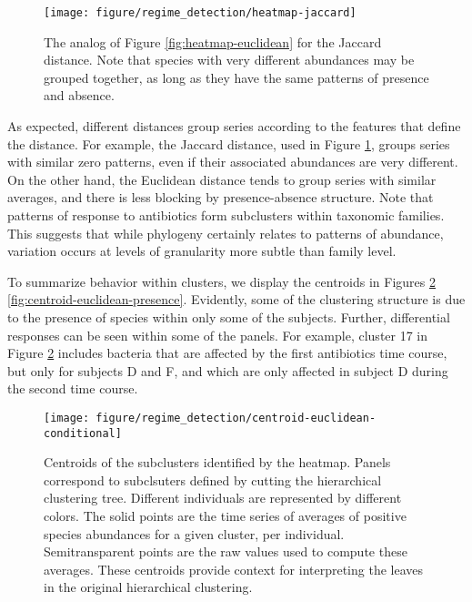 \begin{figure}
  \centering
  \texttt{[image: figure/regime\_detection/heatmap-jaccard]}
  \caption{The analog of Figure \ref{fig:heatmap-euclidean} for the Jaccard
    distance. Note that species with very different abundances may be grouped
    together, as long as they have the same patterns of presence and absence.
    \label{fig:heatmap-jaccard} }
\end{figure}

As expected, different distances group series according to the features that
define the distance. For example, the Jaccard distance, used in Figure
\ref{fig:heatmap-jaccard}, groups series with similar zero patterns, even if
their associated abundances are very different. On the other hand, the Euclidean
distance tends to group series with similar averages, and there is less blocking
by presence-absence structure. Note that patterns of response to antibiotics
form subclusters within taxonomic families. This suggests that while phylogeny
certainly relates to patterns of abundance, variation occurs at levels of
granularity more subtle than family level.

To summarize behavior within clusters, we display the centroids in Figures
\ref{fig:centroid-euclidean-conditional} \ref{fig:centroid-euclidean-presence}.
Evidently, some of the clustering structure is due to the presence of species
within only some of the subjects. Further, differential responses can be seen
within some of the panels. For example, cluster 17 in Figure
\ref{fig:centroid-euclidean-conditional} includes bacteria that are affected by
the first antibiotics time course, but only for subjects D and F, and which are
only affected in subject D during the second time course.

\begin{figure}
  \centering
  \texttt{[image: figure/regime\_detection/centroid-euclidean-conditional]}
  \caption{Centroids of the subclusters identified by the heatmap. Panels
    correspond to subclsuters defined by cutting the hierarchical clustering
    tree. Different individuals are represented by different colors. The solid
    points are the time series of averages of positive species abundances for a
    given cluster, per individual. Semitransparent points are the raw values
    used to compute these averages. These centroids provide context for
    interpreting the leaves in the original hierarchical clustering.
    \label{fig:centroid-euclidean-conditional} }
\end{figure}

